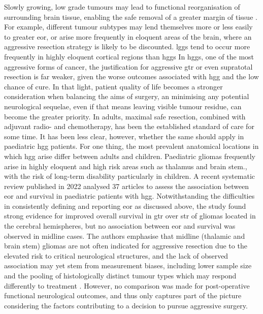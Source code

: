 Slowly growing, low grade tumours may lead to functional reorganisation of surrounding brain tissue, enabling the safe removal of a greater margin of tissue . \autocite{Rossi2019a}
For example, different tumour subtypes may lend themselves more or less easily to greater \gls{eor}, or arise more frequently in eloquent areas of the brain, where an aggressive resection strategy is likely to be discounted.\autocite{deLeeuw2019}
\Glspl{lgg} tend to occur more frequently in highly eloquent cortical regions than \glspl{hgg} \autocite{Duffau2004}
In \glspl{hgg}, one of the most aggressive forms of cancer, the justification for aggressive \gls{gtr} or even supratotal resection is far weaker, given the worse outcomes associated with \gls{hgg} and the low chance of cure.
In that light, patient quality of life becomes a stronger consideration when balancing the aims of surgery, an minimising any potential neurological sequelae, even if that means leaving visible tumour residue, can become the greater priority.
In adults, maximal safe resection, combined with adjuvant radio- and chemotherapy, has been the established standard of care for some time.
It has been less clear, however, whether the same should apply in paediatric \gls{hgg} patients.
For one thing, the most prevalent anatomical locations in which \gls{hgg} arise differ between adults and children.
Paediatric gliomas frequently arise in highly eloquent and high risk  areas such as thalamus and brain stem., with the risk of long-term disability particularly  in children.
A recent systematic review published in 2022 analysed 37 articles to assess the association between \gls{eor} and survival in paediatric patients with \gls{hgg}.\autocite{Hatoum2022}
Notwithstanding the difficulties in consistently defining and reporting \gls{eor} as discussed above, the study found strong evidence for  improved overall survival in \gls{gtr} over \gls{str} of gliomas located in the cerebral hemispheres, but no association between \gls{eor} and survival was observed in midline cases.
The authors emphasise that midline (thalamic and brain stem) gliomas are not often indicated for aggressive resection due to the elevated risk to critical neurological structures, and the lack of observed association may yet stem from measurement biases, including lower sample size and the pooling of histologically distinct tumour types which may respond differently to treatment .
However, no comparison was made for post-operative functional neurological outcomes, and thus only captures part of the picture considering the factors contributing to a decision to pursue aggressive surgery.

